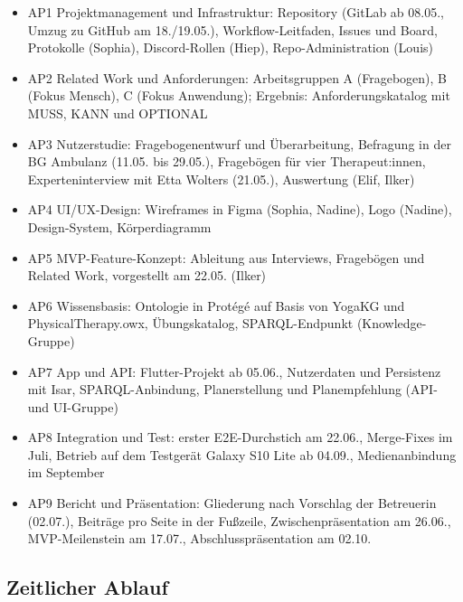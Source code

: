 \begin{itemize}
    \item AP1 Projektmanagement und Infrastruktur: Repository (GitLab ab 08.05., Umzug zu GitHub am 18./19.05.), Workflow-Leitfaden, Issues und Board, Protokolle (Sophia), Discord-Rollen (Hiep), Repo-Administration (Louis)
    \item AP2 Related Work und Anforderungen: Arbeitsgruppen A (Fragebogen), B (Fokus Mensch), C (Fokus Anwendung); Ergebnis: Anforderungskatalog mit MUSS, KANN und OPTIONAL
    \item AP3 Nutzerstudie: Fragebogenentwurf und Überarbeitung, Befragung in der BG Ambulanz (11.05. bis 29.05.), Fragebögen für vier Therapeut:innen, Experteninterview mit Etta Wolters (21.05.), Auswertung (Elif, Ilker)
    \item AP4 UI/UX-Design: Wireframes in Figma (Sophia, Nadine), Logo (Nadine), Design-System, Körperdiagramm
    \item AP5 MVP-Feature-Konzept: Ableitung aus Interviews, Fragebögen und Related Work, vorgestellt am 22.05. (Ilker)
    \item AP6 Wissensbasis: Ontologie in Protégé auf Basis von YogaKG und PhysicalTherapy.owx, Übungskatalog, SPARQL-Endpunkt (Knowledge-Gruppe)
    \item AP7 App und API: Flutter-Projekt ab 05.06., Nutzerdaten und Persistenz mit Isar, SPARQL-Anbindung, Planerstellung und Planempfehlung (API- und UI-Gruppe)
    \item AP8 Integration und Test: erster E2E-Durchstich am 22.06., Merge-Fixes im Juli, Betrieb auf dem Testgerät Galaxy S10 Lite ab 04.09., Medienanbindung im September
    \item AP9 Bericht und Präsentation: Gliederung nach Vorschlag der Betreuerin (02.07.), Beiträge pro Seite in der Fußzeile, Zwischenpräsentation am 26.06., MVP-Meilenstein am 17.07., Abschlusspräsentation am 02.10.
\end{itemize}

\subsection{Zeitlicher Ablauf}



